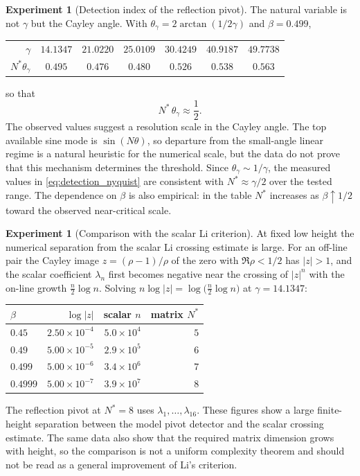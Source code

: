 \documentclass[11pt]{amsart}
\numberwithin{equation}{section}
\theoremstyle{plain}
\theoremstyle{definition}
\newtheorem{experiment}[theorem]{Experiment}
\theoremstyle{remark}
\begin{document}
\begin{experiment}[Detection index of the reflection pivot]
The natural variable is not $\gamma$ but the Cayley angle.  With
$\theta_\gamma=2\arctan(1/2\gamma)$ and $\beta=0.499$,
\begin{center}
\small
\begin{tabular}{rcccccc}
\toprule
$\gamma$ & $14.1347$ & $21.0220$ & $25.0109$ & $30.4249$ & $40.9187$ & $49.7738$\\
$N^*\theta_\gamma$ & $0.495$ & $0.476$ & $0.480$ & $0.526$ & $0.538$ & $0.563$\\
\bottomrule
\end{tabular}
\end{center}
so that
\begin{equation}
 N^*\,\theta_\gamma\approx\frac12 .
 \label{eq:detection_nyquist}
\end{equation}
The observed values suggest a resolution scale in the Cayley angle.  The top available
sine mode is $\sin(N\theta)$, so departure from the small-angle linear regime is a
natural heuristic for the numerical scale, but the data do not prove that this mechanism
determines the threshold.  Since $\theta_\gamma\sim1/\gamma$, the measured values in
\eqref{eq:detection_nyquist} are consistent with $N^*\approx\gamma/2$ over the tested
range.  The dependence on $\beta$ is also empirical: in the table $N^*$ increases as
$\beta\uparrow1/2$ toward the observed near-critical scale.
\end{experiment}

\begin{experiment}[Comparison with the scalar Li criterion]
\label{exp:vs_scalar_li}
At fixed low height the numerical separation from the scalar Li crossing estimate is large.  For an off-line pair the
Cayley image $z=(\rho-1)/\rho$ of the zero with $\Re\rho<1/2$ has $|z|>1$, and the scalar
coefficient $\lambda_n$ first becomes negative near the crossing of $|z|^n$ with the
on-line growth $\tfrac{n}{2}\log n$.  Solving
$n\log|z|=\log\bigl(\tfrac{n}{2}\log n\bigr)$ at $\gamma=14.1347$:
\begin{center}
\small
\begin{tabular}{lrrr}
\toprule
$\beta$ & $\log|z|$ & scalar $n$ & matrix $N^*$\\
\midrule
$0.45$   & $2.50\times10^{-4}$ & $5.0\times10^{4}$ & $5$\\
$0.49$   & $5.00\times10^{-5}$ & $2.9\times10^{5}$ & $6$\\
$0.499$  & $5.00\times10^{-6}$ & $3.4\times10^{6}$ & $7$\\
$0.4999$ & $5.00\times10^{-7}$ & $3.9\times10^{7}$ & $8$\\
\bottomrule
\end{tabular}
\end{center}
The reflection pivot at $N^*=8$ uses $\lambda_1,\dots,\lambda_{16}$.  These figures show
a large finite-height separation between the model pivot detector and the scalar crossing
estimate.  The same data also show that the required matrix dimension grows with height,
so the comparison is not a uniform complexity theorem and should not be read as a general
improvement of Li's criterion.
\end{experiment}
\end{document}

